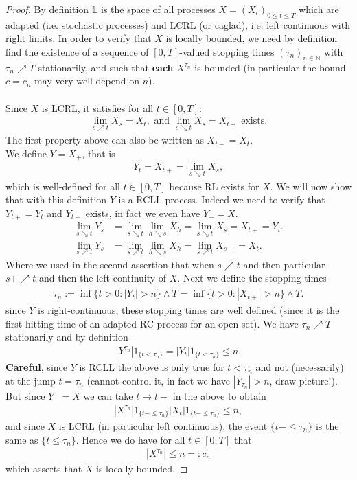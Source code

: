 \documentclass[12pt,a4paper, twoside]{article}
\theoremstyle{definition}
\begin{document}
\begin{proof}
By definition $\mathbb{L}$ is the space of all processes $X=(X_t)_{0 \leq t \leq T}$ which are adapted (i.e. stochastic processes) and LCRL (or caglad), i.e. left continuous with right limits. In order to verify that $X$ is locally bounded, we need by definition find the existence of a sequence of $[0,T]$-valued stopping times $( \tau_n)_{n \in \mathbb{N}}$ with $\tau_n \nearrow T$ stationarily, and such that \textbf{each} $X^{\tau_n}$ is bounded (in particular the bound $c=c_n$ may very well depend on $n$). 
\\
\\
Since $X$ is LCRL, it satisfies for all $t \in [0,T]$:
\begin{align*}
\lim_{s \nearrow t} X_s=X_t, \text{ and }
\lim_{s \searrow t} X_s= X_{t+} \text{ exists}.
\end{align*}
The first property above can also be written as $X_{t-}=X_t$. \\
 We define $Y=X_+$, that is
\begin{align*}
Y_t=X_{t+}= \lim_{s \searrow t} X_s,
\end{align*} which is well-defined for all $t \in [0,T]$ because RL exists for $X$. We will now show that with this definition $Y$ is a RCLL process. Indeed we need to verify that $Y_{t+}=Y_t$ and $Y_{t-}$ exists, in fact we even have $Y_-=X$.
\begin{align*}
\lim_{s \searrow t} Y_s &= \lim_{s \searrow t} \lim_{ h \searrow s} X_h = \lim_{s \searrow t} X_{s} = X_{t+}=Y_t. \tag{RC} \\
\lim_{s \nearrow t} Y_s& = \lim_{s \nearrow t} \lim_{h \searrow s} X_h = \lim_{s \nearrow t} X_{s+} = X_t. \tag{LL}
\end{align*}
Where we used in the second assertion that when $s \nearrow t$ and then particular $s+ \nearrow t$ and then the left continuity of $X$. Next we define the stopping times
\begin{align*}
\tau_n := \inf \{ t > 0 : |Y_t| > n \} \wedge T = \inf \{t >0 : |X_{t+}| >n \} \wedge T.
\end{align*}
since $Y$ is right-continuous, these stopping times are well defined (since it is the first hitting time of an adapted RC process for an open set). We have $\tau_n \nearrow T$ stationarily and by definition \begin{align*}
|Y^{\tau_n}|1_{\{ t < \tau_n\}} = |Y_t| 1_{\{ t < \tau_n\}} \leq n.
\end{align*}
\textbf{Careful}, since $Y$ is RCLL the above is only true for $t < \tau_n$ and not (necessarily) at the jump $t = \tau_n$ (cannot control it, in fact we have $|Y_{\tau_n}|>n$, draw picture!). But since $Y_-=X$ we can take $t \to t-$ in the above to obtain \begin{align*}
|X^{\tau_n}|1_{\{ t- \leq \tau_n\}} |X_t| 1_{ \{ t- \leq \tau_n\}} \leq n,
\end{align*}
and since $X$ is LCRL (in particular left continuous), the event $\{t- \leq \tau_n\}$ is the same as $\{t \leq \tau_n\}$. Hence we do have for all $t \in [0,T]$ that
\begin{align*}
|X^{\tau_n}| \leq n=:c_n
\end{align*}
which asserts that $X$ is locally bounded. 
\end{proof}
\end{document}
